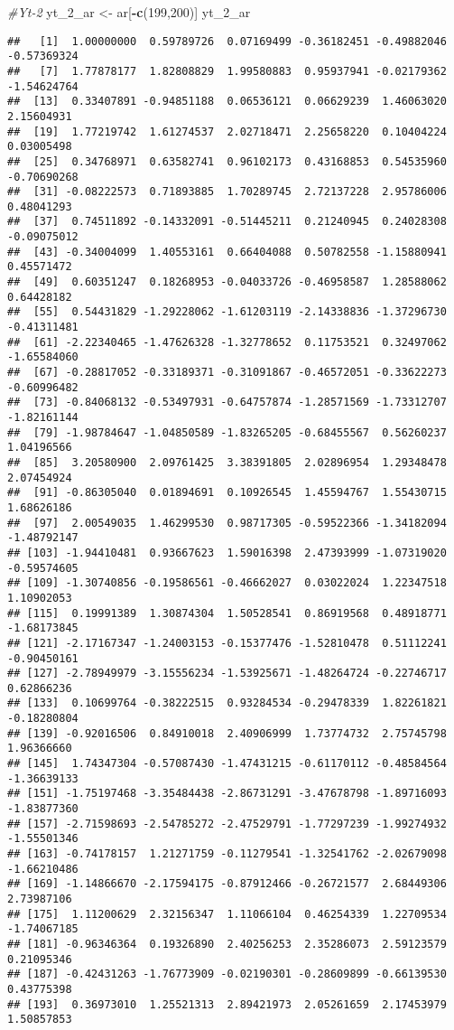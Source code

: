 \documentclass[
]{article}
\newenvironment{Shaded}{\begin{snugshade}}{\end{snugshade}}
\newcommand{\CommentTok}[1]{\textcolor[rgb]{0.56,0.35,0.01}{\textit{#1}}}
\newcommand{\DecValTok}[1]{\textcolor[rgb]{0.00,0.00,0.81}{#1}}
\newcommand{\FunctionTok}[1]{\textcolor[rgb]{0.13,0.29,0.53}{\textbf{#1}}}
\newcommand{\NormalTok}[1]{#1}
\newcommand{\OtherTok}[1]{\textcolor[rgb]{0.56,0.35,0.01}{#1}}
\newcommand{\SpecialCharTok}[1]{\textcolor[rgb]{0.81,0.36,0.00}{\textbf{#1}}}
\begin{document}
\begin{Shaded}
\begin{Highlighting}[]
\CommentTok{\#Yt{-}2}
\NormalTok{yt\_2\_ar }\OtherTok{\textless{}{-}}\NormalTok{ ar[}\SpecialCharTok{{-}}\FunctionTok{c}\NormalTok{(}\DecValTok{199}\NormalTok{,}\DecValTok{200}\NormalTok{)]}
\NormalTok{yt\_2\_ar}
\end{Highlighting}
\end{Shaded}

\begin{verbatim}
##   [1]  1.00000000  0.59789726  0.07169499 -0.36182451 -0.49882046 -0.57369324
##   [7]  1.77878177  1.82808829  1.99580883  0.95937941 -0.02179362 -1.54624764
##  [13]  0.33407891 -0.94851188  0.06536121  0.06629239  1.46063020  2.15604931
##  [19]  1.77219742  1.61274537  2.02718471  2.25658220  0.10404224  0.03005498
##  [25]  0.34768971  0.63582741  0.96102173  0.43168853  0.54535960 -0.70690268
##  [31] -0.08222573  0.71893885  1.70289745  2.72137228  2.95786006  0.48041293
##  [37]  0.74511892 -0.14332091 -0.51445211  0.21240945  0.24028308 -0.09075012
##  [43] -0.34004099  1.40553161  0.66404088  0.50782558 -1.15880941  0.45571472
##  [49]  0.60351247  0.18268953 -0.04033726 -0.46958587  1.28588062  0.64428182
##  [55]  0.54431829 -1.29228062 -1.61203119 -2.14338836 -1.37296730 -0.41311481
##  [61] -2.22340465 -1.47626328 -1.32778652  0.11753521  0.32497062 -1.65584060
##  [67] -0.28817052 -0.33189371 -0.31091867 -0.46572051 -0.33622273 -0.60996482
##  [73] -0.84068132 -0.53497931 -0.64757874 -1.28571569 -1.73312707 -1.82161144
##  [79] -1.98784647 -1.04850589 -1.83265205 -0.68455567  0.56260237  1.04196566
##  [85]  3.20580900  2.09761425  3.38391805  2.02896954  1.29348478  2.07454924
##  [91] -0.86305040  0.01894691  0.10926545  1.45594767  1.55430715  1.68626186
##  [97]  2.00549035  1.46299530  0.98717305 -0.59522366 -1.34182094 -1.48792147
## [103] -1.94410481  0.93667623  1.59016398  2.47393999 -1.07319020 -0.59574605
## [109] -1.30740856 -0.19586561 -0.46662027  0.03022024  1.22347518  1.10902053
## [115]  0.19991389  1.30874304  1.50528541  0.86919568  0.48918771 -1.68173845
## [121] -2.17167347 -1.24003153 -0.15377476 -1.52810478  0.51112241 -0.90450161
## [127] -2.78949979 -3.15556234 -1.53925671 -1.48264724 -0.22746717  0.62866236
## [133]  0.10699764 -0.38222515  0.93284534 -0.29478339  1.82261821 -0.18280804
## [139] -0.92016506  0.84910018  2.40906999  1.73774732  2.75745798  1.96366660
## [145]  1.74347304 -0.57087430 -1.47431215 -0.61170112 -0.48584564 -1.36639133
## [151] -1.75197468 -3.35484438 -2.86731291 -3.47678798 -1.89716093 -1.83877360
## [157] -2.71598693 -2.54785272 -2.47529791 -1.77297239 -1.99274932 -1.55501346
## [163] -0.74178157  1.21271759 -0.11279541 -1.32541762 -2.02679098 -1.66210486
## [169] -1.14866670 -2.17594175 -0.87912466 -0.26721577  2.68449306  2.73987106
## [175]  1.11200629  2.32156347  1.11066104  0.46254339  1.22709534 -1.74067185
## [181] -0.96346364  0.19326890  2.40256253  2.35286073  2.59123579  0.21095346
## [187] -0.42431263 -1.76773909 -0.02190301 -0.28609899 -0.66139530  0.43775398
## [193]  0.36973010  1.25521313  2.89421973  2.05261659  2.17453979  1.50857853
\end{verbatim}
\end{document}
